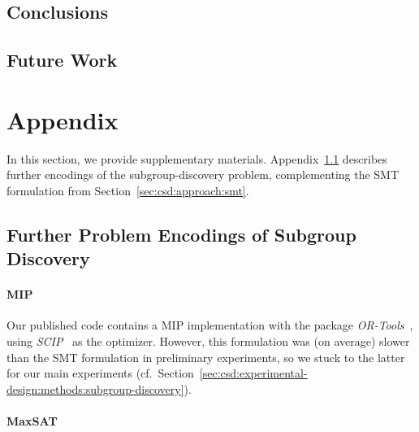 \documentclass{article}
\theoremstyle{definition}
\begin{document}
\subsection{Conclusions}
\label{sec:csd:conclusion:conclusion}

\subsection{Future Work}
\label{sec:csd:conclusion:future-work}


\appendix

\section{Appendix}
\label{sec:csd:appendix}

In this section, we provide supplementary materials.
Appendix~\ref{sec:csd:appendix:further-encodings} describes further encodings of the subgroup-discovery problem, complementing the SMT formulation from Section~\ref{sec:csd:approach:smt}.

\subsection{Further Problem Encodings of Subgroup Discovery}
\label{sec:csd:appendix:further-encodings}

\paragraph{MIP}

Our published code contains a MIP implementation with the package \emph{OR-Tools}~\cite{perron2022or-tools}, using \emph{SCIP}~\cite{bestuzheva2021scip} as the optimizer.
However, this formulation was (on average) slower than the SMT formulation in preliminary experiments, so we stuck to the latter for our main experiments (cf.~Section~\ref{sec:csd:experimental-design:methods:subgroup-discovery}).

\paragraph{MaxSAT}

\cite{li2021maxsat} \cite{bacchus2021maximum}

\renewcommand*{\bibfont}{\small} %
\printbibliography
\end{document}
